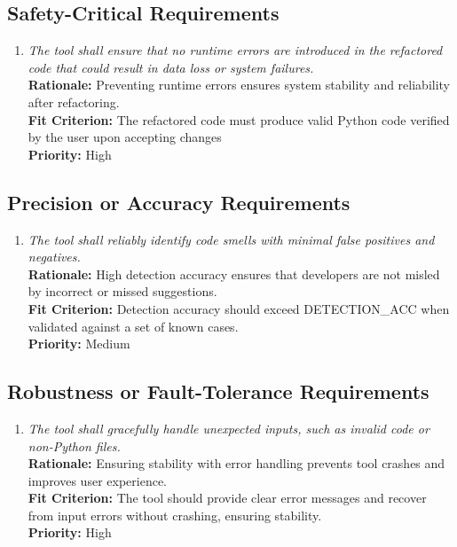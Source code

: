 \documentclass[12pt]{article}
\begin{document}
\subsection{Safety-Critical Requirements}
\begin{enumerate}[label=PR-SCR \arabic*., wide=0pt, leftmargin=*]
  \item \emph{The tool shall ensure that no runtime errors are
      introduced in the refactored code that could result in data loss
    or system failures.}\\[2mm]
    {\bf Rationale:} Preventing runtime errors ensures system
    stability and reliability after refactoring.\\
    {\bf Fit Criterion:} The refactored code must produce valid
    Python code verified by the user upon accepting changes\\
    {\bf Priority:} High
\end{enumerate}
\subsection{Precision or Accuracy Requirements}
\begin{enumerate}[label=PR-PAR \arabic*., wide=0pt, leftmargin=*]
  \item \emph{The tool shall reliably identify code smells with
    minimal false positives and negatives.}\\[2mm]
    {\bf Rationale:} High detection accuracy ensures that developers
    are not misled by incorrect or missed suggestions.\\
    {\bf Fit Criterion:} Detection accuracy should exceed
    DETECTION\_ACC when validated against a set of known cases.\\
    {\bf Priority:} Medium
\end{enumerate}

\subsection{Robustness or Fault-Tolerance Requirements}
\begin{enumerate}[label=PR-RFT \arabic*., wide=0pt, leftmargin=*]
  \item \emph{The tool shall gracefully handle unexpected inputs,
    such as invalid code or non-Python files.}\\[2mm]
    {\bf Rationale:} Ensuring stability with error handling prevents
    tool crashes and improves user experience.\\
    {\bf Fit Criterion:} The tool should provide clear error messages
    and recover from input errors without crashing, ensuring stability.\\
    {\bf Priority:} High
\end{enumerate}
\end{document}
